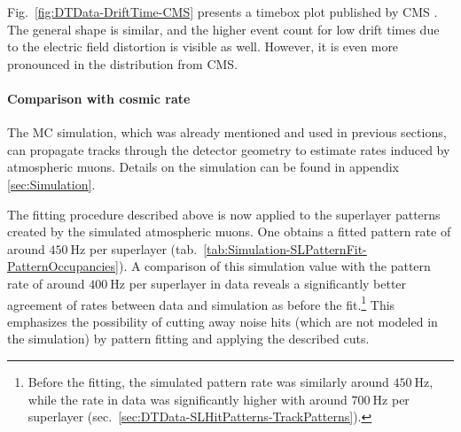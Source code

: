 \par Fig.\ \ref{fig:DTData-DriftTime-CMS} presents a timebox plot published by \ac{CMS} \cite{CMS-Main}. The general shape is similar, and the higher event count for low drift times due to the electric field distortion is visible as well. However, it is even more pronounced in the distribution from \ac{CMS}.
\paragraph{Comparison with cosmic rate}
The \ac{MC} simulation, which was already mentioned and used in previous sections, can propagate tracks through the detector geometry to estimate rates induced by atmospheric muons. Details on the simulation can be found in appendix \ref{sec:Simulation}.
\par The fitting procedure described above is now applied to the superlayer patterns created by the simulated atmospheric muons. One obtains a fitted pattern rate of around $\SI{450}{\hertz}$ per superlayer (tab.\ \ref{tab:Simulation-SLPatternFit-PatternOccupancies}). A comparison of this simulation value with the pattern rate of around $\SI{400}{\hertz}$ per superlayer in data reveals a significantly better agreement of rates between data and simulation as before the fit.\footnote{Before the fitting, the simulated pattern rate was similarly around $\SI{450}{\hertz}$, while the rate in data was significantly higher with around $\SI{700}{\hertz}$ per superlayer (sec.\ \ref{sec:DTData-SLHitPatterns-TrackPatterns}).} This emphasizes the possibility of cutting away noise hits (which are not modeled in the simulation) by pattern fitting and applying the described cuts.
